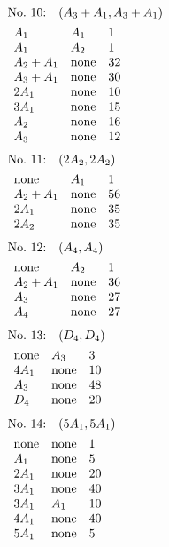 %
%
\begin{align*}
&\hbox to 4cm {\textrm{No.~10:}\quad$(A_{3}+A_{1}, A_{3}+A_{1})$\hss}\\ 
&\begin{array}{lll}
A_{1} & A_{1} & 1\\
A_{1} & A_{2} & 1\\
A_{2}+A_{1} & \none & 32\\
A_{3}+A_{1} & \none & 30\\
2A_{1} & \none & 10\\
3A_{1} & \none & 15\\
A_{2} & \none & 16\\
A_{3} & \none & 12\\
\end{array}
\end{align*}
%
%
\begin{align*}
&\hbox to 4cm {\textrm{No.~11:}\quad$(2A_{2}, 2A_{2})$\hss}\\ 
&\begin{array}{lll}
\none & A_{1} & 1\\
A_{2}+A_{1} & \none & 56\\
2A_{1} & \none & 35\\
2A_{2} & \none & 35\\
\end{array}
\end{align*}
%
%
\begin{align*}
&\hbox to 4cm {\textrm{No.~12:}\quad$(A_{4}, A_{4})$\hss}\\ 
&\begin{array}{lll}
\none & A_{2} & 1\\
A_{2}+A_{1} & \none & 36\\
A_{3} & \none & 27\\
A_{4} & \none & 27\\
\end{array}
\end{align*}
%
%
\begin{align*}
&\hbox to 4cm {\textrm{No.~13:}\quad$(D_{4}, D_{4})$\hss}\\ 
&\begin{array}{lll}
\none & A_{3} & 3\\
4A_{1} & \none & 10\\
A_{3} & \none & 48\\
D_{4} & \none & 20\\
\end{array}
\end{align*}
%
%
\begin{align*}
&\hbox to 4cm {\textrm{No.~14:}\quad$(5A_{1}, 5A_{1})$\hss}\\ 
&\begin{array}{lll}
\none & \none & 1\\
A_{1} & \none & 5\\
2A_{1} & \none & 20\\
3A_{1} & \none & 40\\
3A_{1} & A_{1} & 10\\
4A_{1} & \none & 40\\
5A_{1} & \none & 5\\
\end{array}
\end{align*}
